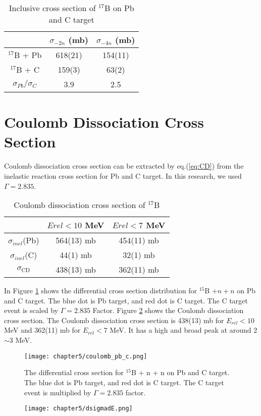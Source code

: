 \begin{table}[h]
\centering
\begin{tabular}{c|c|c}
    \hline
     & $\sigma_{-2n}$ (mb) & $\sigma_{-4n}$ (mb) \\
    \hline
    $^{17}$B + Pb& 618(21) & 154(11) \\ 
    $^{17}$B + C & 159(3) & 63(2) \\ 
    \hline 
    $\sigma_{Pb}/\sigma_{C}$ & 3.9 & 2.5 \\ 
    \hline
\end{tabular}
\caption{Inclusive cross section of $^{17}$B on Pb and C target}
\label{tab:Inclusive Cross Section of Boron Isotopes}
\end{table}

\section{Coulomb Dissociation Cross Section}
Coulomb dissociation cross section can be extracted by eq.(\ref{eq:CD}) from the inelastic reaction cross section for  Pb and C target. In this research, we used $\Gamma = 2.835$\cite{Ogata}. 

\begin{table}[h]
    \centering
    \begin{tabular}[h]{c|c|c}
        \hline
         &  $E{rel} < 10$ MeV&  $E{rel} < 7$ MeV \\
        \hline
        $\sigma_{inel}$(Pb) &  564(13) mb & 454(11) mb  \\
        $\sigma_{inel}$(C) &  44(1) mb & 32(1) mb  \\
        $\sigma_{\text{CD}}$ &  438(13) mb & 362(11) mb \\
        \hline
    \end{tabular}
\caption{Coulomb dissociation cross section of ${}^{17}$B}
\label{tab:CD}
\end{table}
In Figure \ref{fig:Pb+C} shows the differential cross section distribution for ${}^{15}$B $+ n + n$ on Pb and C target. The blue dot is Pb target, and red dot is C target. The C target event is scaled by $\Gamma = 2.835$ Factor. Figure \ref{fig:CD} shows the Coulomb dissociation cross section. The Coulomb dissociation cross section is 438(13) mb for $E_{rel} < 10$ MeV and 362(11) mb for $E_{rel} < 7$ MeV. It has a high and broad peak at around 2$\sim$3 MeV. 
\begin{figure}[h]
    \centering
    \texttt{[image: chapter5/coulomb\_pb\_c.png]}    
    \caption[The differential cross section for ${}^{15}$B + n + n on Pb and C target]{The differential cross section for ${}^{15}$B + n + n on Pb and C target. The blue dot is Pb target, and red dot is C target. The C target event is multiplied by $\Gamma = 2.835$ factor.}
    \label{fig:Pb+C}
\end{figure}
\begin{figure}[h]
    \centering
    \texttt{[image: chapter5/dsigmadE.png]}    
    \label{fig:CD}
\end{figure}    
\clearpage

